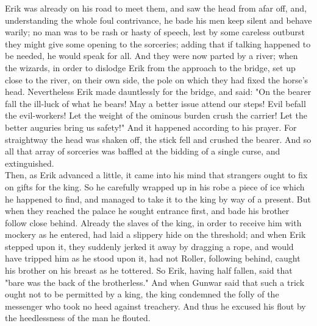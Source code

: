 \documentclass[10pt,a4paper]{report}
\begin{document}
Erik was already on his road to meet them, and saw the head from afar off, and, understanding the whole foul contrivance, he bade his men keep silent and behave warily; no man was to be rash or hasty of speech, lest by some careless outburst they might give some opening to the sorceries; adding that if talking happened to be needed, he would speak for all. And they were now parted by a river; when the wizards, in order to dislodge Erik from the approach to the bridge, set up close to the river, on their own side, the pole on which they had fixed the horse's head. Nevertheless Erik made dauntlessly for the bridge, and said: "On the bearer fall the ill-luck of what he bears! May a better issue attend our steps! Evil befall the evil-workers! Let the weight of the ominous burden crush the carrier! Let the better auguries bring us safety!" And it happened according to his prayer. For straightway the head was shaken off, the stick fell and crushed the bearer. And so all that array of sorceries was baffled at the bidding of a single curse, and extinguished.\\

Then, as Erik advanced a little, it came into his mind that strangers ought to fix on gifts for the king. So he carefully wrapped up in his robe a piece of ice which he happened to find, and managed to take it to the king by way of a present. But when they reached the palace he sought entrance first, and bade his brother follow close behind. Already the slaves of the king, in order to receive him with mockery as he entered, had laid a slippery hide on the threshold; and when Erik stepped upon it, they suddenly jerked it away by dragging a rope, and would have tripped him as he stood upon it, had not Roller, following behind, caught his brother on his breast as he tottered. So Erik, having half fallen, said that "bare was the back of the brotherless." And when Gunwar said that such a trick ought not to be permitted by a king, the king condemned the folly of the messenger who took no heed against treachery. And thus he excused his flout by the heedlessness of the man he flouted.\\
\end{document}
